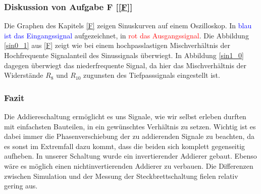 \subsubsection{Diskussion von Aufgabe F [\ref{F}]}
Die Graphen des Kapitels \ref{F} zeigen Sinuskurven auf einem Oszilloskop. In \textcolor{blue}{blau ist das Eingangssignal} aufgezeichnet, in \textcolor{red}{rot das Ausgangssignal}.
Die Abbildung \ref{sin0_1} aus \ref{F} zeigt wie bei einem hochpasslastigen Mischverhältnis der Hochfrequente Signalanteil des Sinussignals überwiegt.
In Abbildung \ref{sin1_0} dagegen überwiegt das niederfrequente Signal, da hier das Mischverhältnis der Widerstände $R_{8}$ und $R_{10}$ zugunsten des Tiefpasssignals eingestellt ist.
\newpage
\subsubsection{Fazit}
Die Addiereschaltung ermöglicht es uns Signale, wie wir selbst erleben durften mit einfachsten Bauteilen, in ein gewünschtes Verhältnis zu setzen. Wichtig ist es dabei immer die Phasenverschiebung der zu addierenden Signale zu beachten, da es sonst im Extremfall dazu kommt, dass die beiden sich komplett gegenseitig aufheben. In unserer Schaltung wurde ein invertierender Addierer gebaut. Ebenso wäre es möglich einen nichtinvertierenden Addierer zu verbauen. Die Differenzen zwischen Simulation und der Messung der Steckbrettschaltung fielen relativ gering aus.



